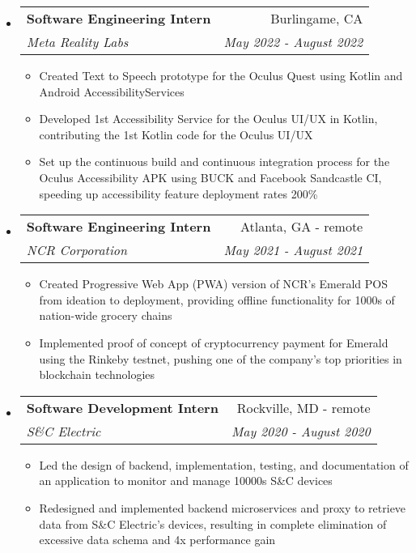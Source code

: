 \documentclass[letterpaper,10pt]{article}
\makeatletter
\newcommand{\resitem}[1]{\item #1 \vspace{-2pt}}
\newcommand{\ressubheading}[4]{
\begin{tabular*}{7.0in}{l@{\extracolsep{\fill}}r}
		\textbf{#1} & #2 \\
		\textit{#3} & \textit{#4} \\
\end{tabular*}\vspace{-6pt}}
\makeatother
\begin{document}
\begin{itemize}
\item
    \ressubheading{Software Engineering Intern}{Burlingame, CA}{Meta Reality Labs}{May 2022 - August 2022}
    \begin{itemize}
        \resitem{Created Text to Speech prototype for the Oculus Quest using Kotlin and Android AccessibilityServices}
        \resitem{Developed 1st Accessibility Service for the Oculus UI/UX in Kotlin, contributing the 1st Kotlin code for the Oculus UI/UX}
        \resitem{Set up the continuous build and continuous integration process for the Oculus Accessibility APK using BUCK and Facebook Sandcastle CI, speeding up accessibility feature deployment rates 200\%}
    \end{itemize}
\item
    \ressubheading{Software Engineering Intern}{Atlanta, GA - remote}{NCR Corporation}{May 2021 - August 2021}
    \begin{itemize}
        \resitem{Created Progressive Web App (PWA) version of NCR's Emerald POS from ideation to deployment, providing offline functionality for 1000s of nation-wide grocery chains}
        \resitem{Implemented proof of concept of cryptocurrency payment for Emerald using the Rinkeby testnet, pushing one of the company's top priorities in blockchain technologies}
    \end{itemize}
\item
    \ressubheading{Software Development Intern}{Rockville, MD - remote}{S\&C Electric}{May 2020 - August 2020}
    \begin{itemize}
        \resitem{Led the design of backend, implementation, testing, and documentation of an application to monitor and manage 10000s S\&C devices}
        \resitem{Redesigned and implemented backend microservices and proxy to retrieve data from S\&C Electric's devices, resulting in complete elimination of excessive data schema and 4x performance gain}

\end{itemize}
\end{itemize}
\end{document}
